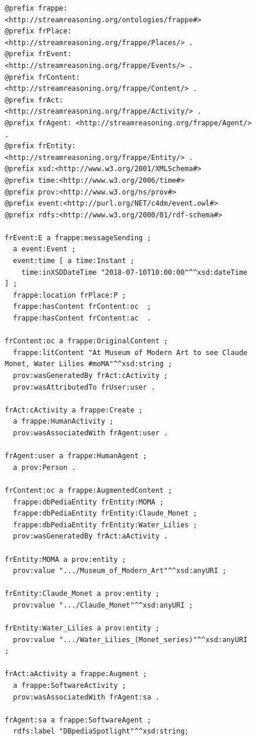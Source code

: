 \begin{figure}[p]
\begin{minipage}{0.95\linewidth}
\begin{lstlisting}[label={lst:sm}, caption={The \frappe{} representation of a social message}, style=N3]
@prefix frappe:<http://streamreasoning.org/ontologies/frappe#>
@prefix frPlace: <http://streamreasoning.org/frappe/Places/> .
@prefix frEvent: <http://streamreasoning.org/frappe/Events/> .
@prefix frContent: <http://streamreasoning.org/frappe/Content/> .
@prefix frAct: <http://streamreasoning.org/frappe/Activity/> .
@prefix frAgent: <http://streamreasoning.org/frappe/Agent/> .
@prefix frEntity: <http://streamreasoning.org/frappe/Entity/> .
@prefix xsd:<http://www.w3.org/2001/XMLSchema#>
@prefix time:<http://www.w3.org/2006/time#>
@prefix prov:<http://www.w3.org/ns/prov#>
@prefix event:<http://purl.org/NET/c4dm/event.owl#>
@prefix rdfs:<http://www.w3.org/2000/01/rdf-schema#>

frEvent:E a frappe:messageSending ; 
  a event:Event ;
  event:time [ a time:Instant ;
    time:inXSDDateTime "2018-07-10T10:00:00"^^xsd:dateTime ] ;
  frappe:location frPlace:P ;
  frappe:hasContent frContent:oc  ;
  frappe:hasContent frContent:ac  .

frContent:oc a frappe:OriginalContent ;
  frappe:litContent "At Museum of Modern Art to see Claude Monet, Water Lilies #moMA"^^xsd:string ;
  prov:wasGeneratedBy frAct:cActivity ;
  prov:wasAttributedTo frUser:user .

frAct:cActivity a frappe:Create ;
  a frappe:HumanActivity ;
  prov:wasAssociatedWith frAgent:user .
    
frAgent:user a frappe:HumanAgent ;
  a prov:Person .

frContent:oc a frappe:AugmentedContent ;
  frappe:dbPediaEntity frEntity:MOMA ;
  frappe:dbPediaEntity frEntity:Claude_Monet ;
  frappe:dbPediaEntity frEntity:Water_Lilies ;
  prov:wasGeneratedBy frAct:aActivity .

frEntity:MOMA a prov:entity ;
  prov:value ".../Museum_of_Modern_Art"^^xsd:anyURI ;

frEntity:Claude_Monet a prov:entity ;
  prov:value ".../Claude_Monet"^^xsd:anyURI ;

frEntity:Water_Lilies a prov:entity ;
  prov:value ".../Water_Lilies_(Monet_series)"^^xsd:anyURI ;
    
frAct:aActivity a frappe:Augment ;
  a frappe:SoftwareActivity ;
  prov:wasAssociatedWith frAgent:sa .

frAgent:sa a frappe:SoftwareAgent ;
  rdfs:label "DBpediaSpotlight"^^xsd:string;
\end{lstlisting}
\end{minipage}
\end{figure}

